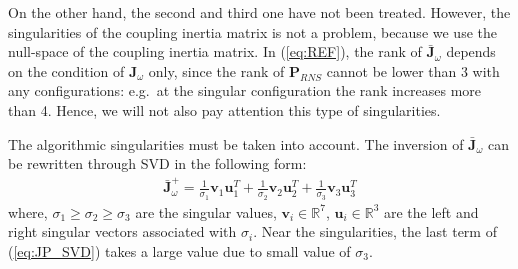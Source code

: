 \documentclass[preprint,12pt]{elsarticle}
\def\eq#1{{(\ref{eq:#1})}}
\def\R#1{{\in\mathbb{R}^{#1}}}
\begin{document}
On the other hand,
the second and third one have not been treated.
However,
the singularities of the coupling inertia matrix is not a problem,
because we use the null-space of the coupling inertia matrix.
In \eq{REF},
the rank of $\bar{\bm{J}}_{\omega}$ depends on the condition of $\bm{J}_{\omega}$ only,
since the rank of $\bm{P}_{RNS}$ cannot be lower than 3 with any configurations:
e.g.\ at the singular configuration the rank increases more than 4.
Hence, we will not also pay attention this type of singularities.

The algorithmic singularities must be taken into account.
The inversion of $\bar{\bm{J}}_{\omega}$ can be rewritten through SVD in the following form:
%
\begin{align}
  \bar{\bm{J}}_{\omega}^{+} = \frac{1}{\sigma_{1}}\bm{v}_{1}\bm{u}_{1}^{T} + 
  \frac{1}{\sigma_{2}}\bm{v}_{2}\bm{u}_{2}^{T} + 
  \frac{1}{\sigma_{3}}\bm{v}_{3}\bm{u}_{3}^{T}\label{eq:JP_SVD}
\end{align}
%
where, $\sigma_{1} \geq \sigma_{2} \geq \sigma_{3}$ are the singular values,
$\bm{v}_{i}\R{7}$, $\bm{u}_{i}\R{3}$ are the left and right singular vectors
associated with $\sigma_{i}$.
Near the singularities,
the last term of \eq{JP_SVD} takes a large value due to small value of $\sigma_{3}$.
\end{document}
